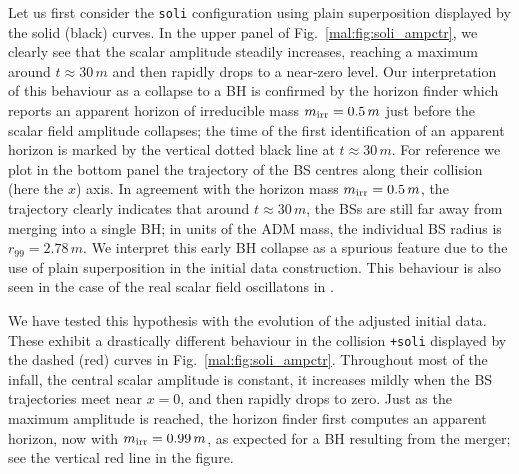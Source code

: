 %
Let us first consider the {\tt soli} configuration using plain
superposition displayed by the solid (black) curves. In the upper
panel of Fig.~\ref{mal:fig:soli_ampctr}, we clearly see
that the scalar amplitude steadily increases, reaching a maximum
around $t\approx 30\,m$ and then rapidly drops to a near-zero level.
Our interpretation of this behaviour as a collapse to a BH is confirmed
by the horizon finder which reports an apparent horizon of irreducible
mass $m_{\rm irr}=0.5\,m$ just before the scalar field amplitude
collapses; the time of the first identification of an apparent horizon
is marked by the vertical dotted black line at $t\approx 30\,m$.
For reference we plot in the bottom panel the trajectory of the BS centres
along their collision (here the $x$) axis. In agreement with the
horizon mass $m_{\rm irr}=0.5\,m$, the trajectory clearly indicates
that around $t\approx 30\,m$, the BSs are still far away from merging
into a single BH; in units of the ADM mass,
the individual BS radius is $r_{99}=2.78\,m$. We interpret
this early BH collapse as a spurious feature due to the use of
plain superposition in the initial data construction.
This behaviour is also seen in the case of the real scalar
field oscillatons in \cite{Helfer:2018vtq}.

We have tested this hypothesis with the evolution
of the adjusted initial data.
These exhibit a drastically different behaviour
in the collision {\tt +soli} displayed by the dashed (red) curves in
Fig.~\ref{mal:fig:soli_ampctr}.
Throughout most of the infall, the central scalar amplitude
is constant, it increases mildly when the BS trajectories meet near $x=0$,
and then rapidly drops to zero. Just as the maximum amplitude is reached,
the horizon finder first computes an apparent horizon, now with
$m_{\rm irr}=0.99\,m$, as expected for a BH resulting from the merger;
see the vertical red line in the figure.

